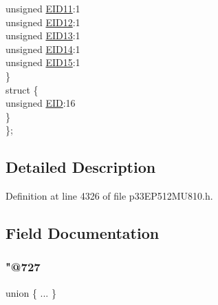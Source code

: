 \begin{DoxyCompactItemize}
\begin{tabbing}
\>\>unsigned \hyperlink{structtag_c1_r_x_f10_e_i_d_b_i_t_s_a710bdb0d602deb021b0be99066008018}{EID11}:1\\
\>\>unsigned \hyperlink{structtag_c1_r_x_f10_e_i_d_b_i_t_s_aa347bb85867bd8d4e0124f7cff8c6472}{EID12}:1\\
\>\>unsigned \hyperlink{structtag_c1_r_x_f10_e_i_d_b_i_t_s_a37d5f3edcbf6ef62f848fd4f3c584f79}{EID13}:1\\
\>\>unsigned \hyperlink{structtag_c1_r_x_f10_e_i_d_b_i_t_s_a7ffc0b0e0d99b8476b6f9a45337c17ab}{EID14}:1\\
\>\>unsigned \hyperlink{structtag_c1_r_x_f10_e_i_d_b_i_t_s_a293cd7dc1746257fa75a60cbd9383cd7}{EID15}:1\\
\>\} \\
\>struct \{\\
\>\>unsigned \hyperlink{structtag_c1_r_x_f10_e_i_d_b_i_t_s_ae80b378c9141f7c03e0b4e55b5f4b54d}{EID}:16\\
\>\} \\
\}; \\

\end{tabbing}\end{DoxyCompactItemize}


\subsection{Detailed Description}


Definition at line 4326 of file p33\+E\+P512\+M\+U810.\+h.



\subsection{Field Documentation}
\mbox{\label{structtag_c1_r_x_f10_e_i_d_b_i_t_s_a818fdc2bcf4d3104d86d5aec128606cd}} 
\subsubsection{\texorpdfstring{"@727}{@727}}
{\footnotesize\ttfamily union \{ ... \} }

\mbox{\label{structtag_c1_r_x_f10_e_i_d_b_i_t_s_ae80b378c9141f7c03e0b4e55b5f4b54d}} 
